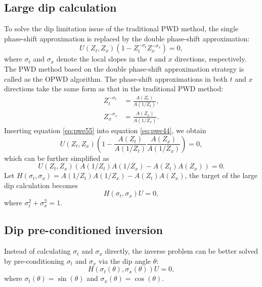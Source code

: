\subsection{Large dip calculation}
To solve the dip limitation issue of the traditional PWD method, the single phase-shift approximation is replaced by the double phase-shift approximation:
 \begin{equation}
\label{eq:pwe44}
U(Z_t,Z_x)(1-Z_t^{-\sigma_t}Z_x^{-\sigma_x}) = 0,
\end{equation}
where $\sigma_t$ and $\sigma_x$ denote the local slopes in the $t$ and $x$ directions, respectively. The PWD method based on the double phase-shift approximation strategy is called as the OPWD algorithm. The phase-shift approximations in both $t$ and $x$ directions take the same form as that in the traditional PWD method:
\begin{equation}
\label{eq:pwe55}
\begin{split}
Z_t^{-\sigma_t} &= \frac{A(Z_t)}{A(1/Z_t)},\\
Z_x^{-\sigma_x} &= \frac{A(Z_x)}{A(1/Z_x)}. 
\end{split}
\end{equation}
Inserting equation \ref{eq:pwe55} into equation \ref{eq:pwe44}, we obtain
 \begin{equation}
\label{eq:pwe442}
U(Z_t,Z_x)(1-\frac{A(Z_t)}{A(1/Z_t)}\frac{A(Z_x)}{A(1/Z_x)}) = 0,
\end{equation}
which can be further simplified as
 \begin{equation}
\label{eq:pwe442}
U(Z_t,Z_x)(A(1/Z_t)A(1/Z_x)-A(Z_t)A(Z_x)) = 0.
\end{equation}
Let $H(\sigma_t,\sigma_x)=A(1/Z_t)A(1/Z_x)-A(Z_t)A(Z_x)$, the target of the large dip calculation becomes
 \begin{equation}
\label{eq:pwe443}
H(\sigma_t,\sigma_x)U= 0,
\end{equation}
where $\sigma_t^2+\sigma_x^2=1$.

\subsection{Dip pre-conditioned inversion}
Instead of calculating $\sigma_t$ and $\sigma_x$ directly, the inverse problem can be better solved by pre-conditioning $\sigma_t$ and $\sigma_x$ via the dip angle $\theta$:
 \begin{equation}
\label{eq:pwe444}
H(\sigma_t(\theta),\sigma_x(\theta))U= 0,
\end{equation}
where $\sigma_t(\theta)=\sin(\theta)$ and $\sigma_x(\theta)=\cos(\theta)$. 

